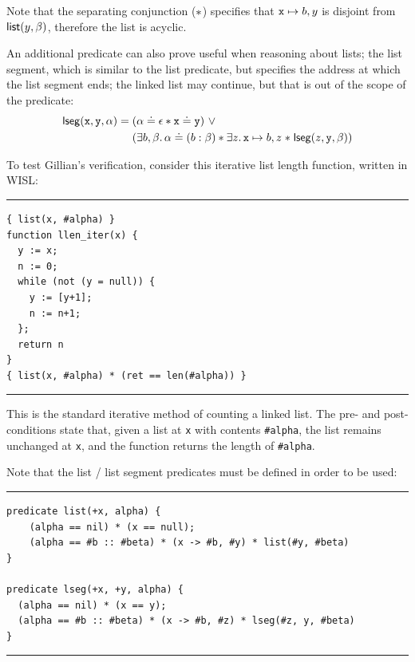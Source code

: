 Note that the separating conjunction ($\mathrel{*}$) specifies that
$\mathtt{x} \mapsto b, y$ is disjoint from $\mathsf{list}(y, \beta)$, therefore the
list is acyclic.

An additional predicate can also prove useful when reasoning about lists; the
list segment, which is similar to the list predicate, but specifies the address
at which the list segment ends; the linked list may continue, but that is out
of the scope of the predicate:
\begin{align*}
  \mathsf{lseg}(\mathtt{x}, \mathtt{y}, \alpha) =\; &(\alpha \doteq \epsilon \ast \mathtt{x} \doteq \mathtt{y})~\lor\\
  &(\exists b, \beta \ldotp \alpha \doteq (b : \beta) \ast \exists z \ldotp \mathtt{x} \mapsto b, z \mathrel{*} \mathsf{lseg}(z, \mathtt{y}, \beta))
\end{align*}

To test Gillian's verification, consider this iterative list length function,
written in WISL:\@

\noindent\rule{\textwidth}{0.5pt}
\vspace{-0.6cm}
\begin{verbatim}
{ list(x, #alpha) }
function llen_iter(x) {
  y := x;
  n := 0;
  while (not (y = null)) {
    y := [y+1];
    n := n+1;
  };
  return n
}
{ list(x, #alpha) * (ret == len(#alpha)) }
\end{verbatim}
\vspace{-0.4cm}
\noindent\rule{\textwidth}{0.5pt}
\vspace{-0.6cm}
\vspace{0.5cm}

This is the standard iterative method of counting a linked list. The pre- and
post-conditions state that, given a list at \texttt{x} with contents
\texttt{\#alpha}, the list remains unchanged at \texttt{x}, and the function
returns the length of \texttt{\#alpha}.

Note that the list / list segment predicates must be defined in order to be used:

\noindent\rule{\textwidth}{0.5pt}
\vspace{-0.6cm}
\begin{verbatim}
predicate list(+x, alpha) {
    (alpha == nil) * (x == null);
    (alpha == #b :: #beta) * (x -> #b, #y) * list(#y, #beta)
}

predicate lseg(+x, +y, alpha) {
  (alpha == nil) * (x == y);
  (alpha == #b :: #beta) * (x -> #b, #z) * lseg(#z, y, #beta)
}
\end{verbatim}
\vspace{-0.4cm}
\noindent\rule{\textwidth}{0.5pt}
\vspace{-0.6cm}
\caption{List predicates in WISL}
\label{lst:list-predicate}

